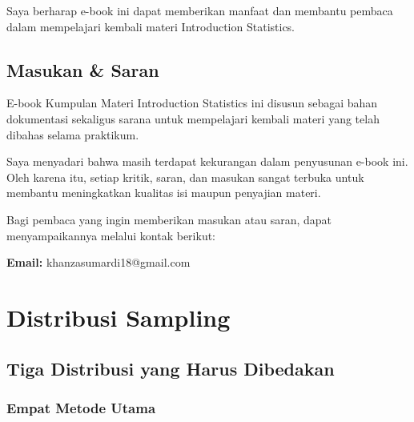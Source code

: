 \documentclass[
  indonesian,
  letterpaper,
]{book}
\begin{document}
Saya berharap e-book ini dapat memberikan manfaat dan membantu pembaca
dalam mempelajari kembali materi Introduction Statistics.

\section*{Masukan \& Saran}\label{masukan-saran}


E-book Kumpulan Materi Introduction Statistics ini disusun sebagai bahan
dokumentasi sekaligus sarana untuk mempelajari kembali materi yang telah
dibahas selama praktikum.

Saya menyadari bahwa masih terdapat kekurangan dalam penyusunan e-book
ini. Oleh karena itu, setiap kritik, saran, dan masukan sangat terbuka
untuk membantu meningkatkan kualitas isi maupun penyajian materi.

Bagi pembaca yang ingin memberikan masukan atau saran, dapat
menyampaikannya melalui kontak berikut:

\textbf{Email:} khanzasumardi18@gmail.com


\chapter{Distribusi Sampling}\label{distribusi-sampling}

\section{Tiga Distribusi yang Harus
Dibedakan}\label{tiga-distribusi-yang-harus-dibedakan}

\subsection{Empat Metode Utama}\label{empat-metode-utama}
\end{document}
